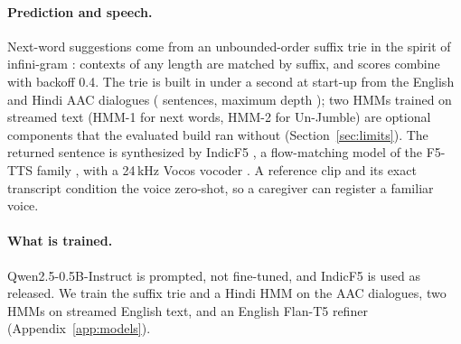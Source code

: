 \paragraph{Prediction and speech.}
Next-word suggestions come from an unbounded-order suffix trie in the spirit of infini-gram \citep{liu2024infinigram}: contexts of any length are matched by suffix, and scores combine with backoff 0.4.
The trie is built in under a second at start-up from the English and Hindi AAC dialogues (\IGSent{} sentences, maximum depth \IGDepth{}); two HMMs trained on streamed text (HMM-1 for next words, HMM-2 for Un-Jumble) are optional components that the evaluated build ran without (Section~\ref{sec:limits}).
The returned sentence is synthesized by IndicF5 \citep{ai4bharat2025indicf5}, a flow-matching model of the F5-TTS family \citep{chen2025f5tts}, with a 24\,kHz Vocos vocoder \citep{siuzdak2023vocos}.
A reference clip and its exact transcript condition the voice zero-shot, so a caregiver can register a familiar voice.

\paragraph{What is trained.}
Qwen2.5-0.5B-Instruct is prompted, not fine-tuned, and IndicF5 is used as released.
We train the suffix trie and a Hindi HMM on the AAC dialogues, two HMMs on streamed English text, and an English Flan-T5 refiner (Appendix~\ref{app:models}).
